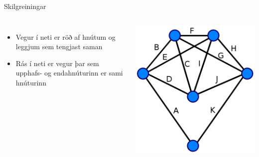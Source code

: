 \documentclass{beamer}
\begin{document}
\begin{frame}{Skilgreiningar}
\begin{columns}
\begin{itemize}
 \item Vegur í neti er röð af hnútum og leggjum sem tengjast saman
 \item Rás í neti er vegur þar sem upphafs- og endahnúturinn er sami hnúturinn
\end{itemize}
\includegraphics[width=\linewidth]{Pics/labelled-eulerian}
\end{columns}
\end{frame}
\end{document}
